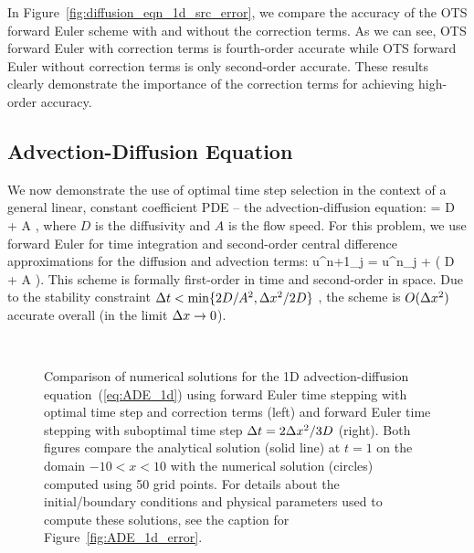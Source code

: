 \documentclass[oneeqnum,onefignum,onetabnum,onethmnum]{siamltex}
\begin{document}
In Figure~\ref{fig:diffusion_eqn_1d_src_error}, we compare the accuracy of 
the OTS forward Euler scheme with and without the correction terms.  As we can 
see, OTS forward Euler with correction terms is fourth-order accurate while 
OTS forward Euler without correction terms is only second-order accurate.  
These results clearly demonstrate the importance of the correction terms for
achieving high-order accuracy.


\subsection{Advection-Diffusion Equation}
We now demonstrate the use of optimal time step selection in the context of 
a general linear, constant coefficient PDE -- the advection-diffusion 
equation:
\beq
   = D  
  + A ,
  \label{eq:ADE_1d}
\eeq
where $D$ is the diffusivity and $A$ is the flow speed.  For this problem,
we use forward Euler for time integration and second-order central 
difference approximations for the diffusion and advection terms:
\beq
  u^{n+1}_j = u^{n}_j 
  + \dt 
    \left( D 
         + A  \right).
  \label{eq:ADE_1d_FD_scheme}
\eeq
This scheme is formally first-order in time and second-order in space.  
Due to the stability constraint $\Delta t < \min \{2D/A^2, \Delta x^2/2D \}$ 
\cite{chan_1984}, the scheme is $O(\Delta x^2)$ accurate overall (in the limit 
$\Delta x \rightarrow 0$).

\begin{figure}[tb]
\begin{center}
\ \ \ \ \
\caption{Comparison of numerical solutions for the 1D advection-diffusion
equation~(\ref{eq:ADE_1d}) using forward Euler time stepping with 
optimal time step and correction terms (left) and forward Euler time 
stepping with suboptimal time step $\Delta t = 2 \Delta x^2/3 D$ (right).  
Both figures compare the analytical solution (solid line) at $t = 1$ on the 
domain $-10 < x < 10$ with the numerical solution (circles) computed using 
50 grid points.  For details about the initial/boundary 
conditions and physical parameters used to compute these solutions, see the
caption for Figure~\ref{fig:ADE_1d_error}.
}
\label{fig:ADE_1d_solns}
\end{center}
\end{figure}
\end{document}
